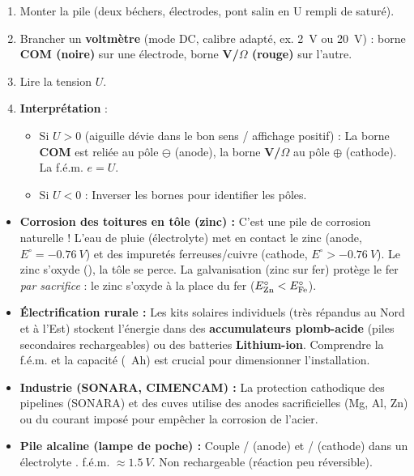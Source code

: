 \documentclass[11pt]{article}
\begin{document}
\begin{methode}
\begin{enumerate}
  \item Monter la pile (deux béchers, électrodes, pont salin en U rempli de  saturé).
  \item Brancher un \textbf{voltmètre} (mode DC, calibre adapté, ex. \SI{2}{V} ou \SI{20}{V}) : borne \textbf{COM (noire)} sur une électrode, borne \textbf{V/$\Omega$ (rouge)} sur l'autre.
  \item Lire la tension $U$.
  \item \textbf{Interprétation} :
        \begin{itemize}
          \item Si $U > 0$ (aiguille dévie dans le bon sens / affichage positif) : La borne \textbf{COM} est reliée au pôle $\ominus$ (anode), la borne \textbf{V/$\Omega$} au pôle $\oplus$ (cathode). La f.é.m. $e = U$.
          \item Si $U < 0$ : Inverser les bornes pour identifier les pôles.
        \end{itemize}
\end{enumerate}
\end{methode}

\begin{savaistu}
\begin{itemize}
  \item \textbf{Corrosion des toitures en tôle (zinc) :} C'est une pile de corrosion naturelle ! L'eau de pluie (électrolyte) met en contact le zinc (anode, $E^\circ = -\SI{0,76}{V}$) et des impuretés ferreuses/cuivre (cathode, $E^\circ > -\SI{0,76}{V}$). Le zinc s'oxyde (), la tôle se perce. La galvanisation (zinc sur fer) protège le fer \emph{par sacrifice} : le zinc s'oxyde à la place du fer ($E^\circ_{\ce{Zn}} < E^\circ_{\ce{Fe}}$).
  \item \textbf{Électrification rurale :} Les kits solaires individuels (très répandus au Nord et à l'Est) stockent l'énergie dans des \textbf{accumulateurs plomb-acide} (piles secondaires rechargeables) ou des batteries \textbf{Lithium-ion}. Comprendre la f.é.m. et la capacité (\SI{}{Ah}) est crucial pour dimensionner l'installation.
  \item \textbf{Industrie (SONARA, CIMENCAM) :} La protection cathodique des pipelines (SONARA) et des cuves utilise des anodes sacrificielles (Mg, Al, Zn) ou du courant imposé pour empêcher la corrosion de l'acier.
  \item \textbf{Pile alcaline (lampe de poche) :} Couple / (anode) et / (cathode) dans un électrolyte . f.é.m. $\approx \SI{1,5}{V}$. Non rechargeable (réaction peu réversible).
\end{itemize}
\end{savaistu}
\end{document}
